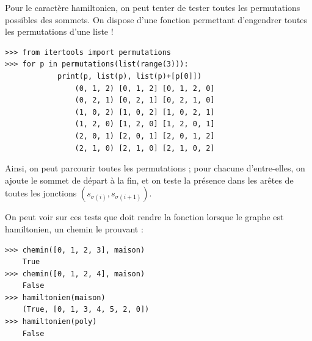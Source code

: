 

Pour le caractère hamiltonien, on peut tenter de tester toutes les permutations possibles des sommets.
On dispose d’une fonction permettant d’engendrer toutes les permutations d’une liste !

\begin{lstlisting}
>>> from itertools import permutations
>>> for p in permutations(list(range(3))):
            print(p, list(p), list(p)+[p[0]])
                (0, 1, 2) [0, 1, 2] [0, 1, 2, 0]
                (0, 2, 1) [0, 2, 1] [0, 2, 1, 0]
                (1, 0, 2) [1, 0, 2] [1, 0, 2, 1]
                (1, 2, 0) [1, 2, 0] [1, 2, 0, 1]
                (2, 0, 1) [2, 0, 1] [2, 0, 1, 2]
                (2, 1, 0) [2, 1, 0] [2, 1, 0, 2]
\end{lstlisting}

Ainsi, on peut parcourir toutes les permutations ; pour chacune d’entre-elles, on ajoute le sommet
de départ à la fin, et on teste la présence dans les arêtes de toutes les jonctions $\left(s_{\sigma(i)},s_{\sigma(i+1)} \right)$.



On peut voir sur ces tests que doit rendre la fonction lorsque le graphe est hamiltonien, un chemin le prouvant :

\begin{lstlisting}
>>> chemin([0, 1, 2, 3], maison)
    True
>>> chemin([0, 1, 2, 4], maison)
    False
>>> hamiltonien(maison)
    (True, [0, 1, 3, 4, 5, 2, 0])
>>> hamiltonien(poly)
    False
\end{lstlisting}



